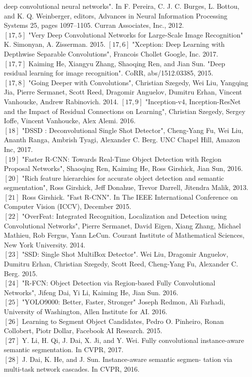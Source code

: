\documentclass{bmvc2k}
\begin{document}
deep convolutional neural networks". In F. Pereira, C. J. C. Burges, L. Bottou, and
K. Q. Weinberger, editors, Advances in Neural Information Processing Systems 25,
pages 1097–1105. Curran Associates, Inc., 2012.\\
$\left[17,5\right]$  "Very Deep Convolutional Networks for Large-Scale Image Recognition"
K. Simonyan, A. Zisserman. 2015.
$\left[17,6\right]$  "Xception: Deep Learning with Depthwise Separable Convolutions",
Francois Chollet
Google, Inc. 2017.\\
$\left[17,7\right]$  Kaiming He, Xiangyu Zhang, Shaoqing Ren, and Jian Sun. "Deep residual learning
for image recognition". CoRR, abs/1512.03385, 2015.\\
$\left[17,8\right]$  "Going Deeper with Convolutions", Christian Szegedy, Wei Liu, Yangqing Jia, Pierre Sermanet, Scott Reed, Dragomir Anguelov, Dumitru Erhan, Vincent Vanhoucke, Andrew Rabinovich. 2014.
$\left[17,9\right]$  "Inception-v4, Inception-ResNet and the Impact of Residual Connections on Learning",
Christian Szegedy, Sergey Ioffe, Vincent Vanhoucke, Alex Alemi. 2016.\\
$\left[18\right]$  "DSSD : Deconvolutional Single Shot Detector",
Cheng-Yang Fu, Wei Liu, Ananth Ranga, Ambrish Tyagi, Alexander C. Berg. UNC Chapel Hill,
Amazon Inc, 2017.\\
$\left[19\right]$  "Faster R-CNN: Towards Real-Time Object Detection with Region Proposal Networks",
Shaoqing Ren, Kaiming He, Ross Girshick, Jian Sun, 2016.\\
$\left[20\right]$  "Rich feature hierarchies for accurate object detection and semantic segmentation",
Ross Girshick, Jeff Donahue, Trevor Darrell, Jitendra Malik, 2013.\\
$\left[21\right]$  Ross Girshick. "Fast R-CNN". In The IEEE International Conference on Computer
Vision (ICCV), December 2015.\\
$\left[22\right]$  "OverFeat:
Integrated Recognition, Localization and Detection
using Convolutional Networks", Pierre Sermanet, David Eigen, Xiang Zhang, Michael Mathieu, Rob Fergus, Yann LeCun. Courant Institute of Mathematical Sciences, New York University. 2014.\\
$\left[23\right]$  "SSD: Single Shot MultiBox Detector".
Wei Liu, Dragomir Anguelov, Dumitru Erhan, Christian Szegedy, Scott Reed, Cheng-Yang Fu, Alexander C. Berg. 2015.\\
$\left[24\right]$  "R-FCN: Object Detection via Region-based Fully Convolutional Networks", Jifeng Dai, Yi Li, Kaiming He, Jian Sun. 2016.\\
$\left[25\right]$  "YOLO9000: Better, Faster, Stronger"
Joseph Redmon, Ali Farhadi, University of Washington, Allen Institute for AI. 2016.\\
$\left[26\right]$  Learning to Segment Object Candidates, Pedro O. Pinheiro, Ronan Collobert, Piotr Dollar, Facebook AI Research. 2015.\\
$\left[27\right]$  Y. Li, H. Qi, J. Dai, X. Ji, and Y. Wei. Fully convolutional
instance-aware semantic segmentation. In CVPR, 2017.\\
$\left[28\right]$  J. Dai, K. He, and J. Sun. Instance-aware semantic segmen-
tation via multi-task network cascades. In CVPR, 2016.\\
\end{document}
